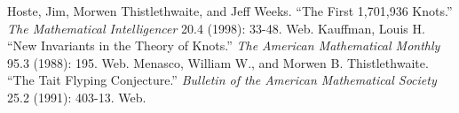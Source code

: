 \begin{paper}

\begin{thebibliography}{}
Hoste, Jim, Morwen Thistlethwaite, and Jeff Weeks.
``The First 1,701,936 Knots.''
\textit{The Mathematical Intelligencer}
20.4 (1998): 33-48. Web.
Kauffman, Louis H.
``New Invariants in the Theory of Knots.''
\textit{The American Mathematical Monthly}
95.3 (1988): 195. Web.
Menasco, William W., and Morwen B. Thistlethwaite.
``The Tait Flyping Conjecture.''
\textit{Bulletin of the American Mathematical Society}
25.2 (1991): 403-13. Web.
\end{thebibliography}

\end{paper}

